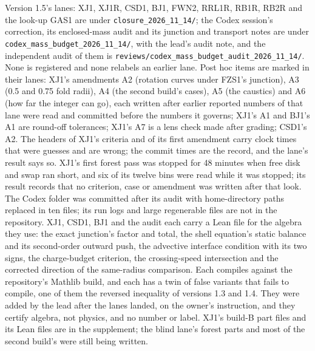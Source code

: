 \documentclass[10pt]{article}
\begin{document}
Version 1.5's lanes: XJ1, XJ1R, CSD1, BJ1, FWN2, RRL1R, RB1R, RB2R and the look-up GAS1 are under \texttt{closure\_2026\_11\_14/}; the Codex session's correction, its enclosed-mass audit and its junction and transport notes are under \texttt{codex\_mass\_budget\_2026\_11\_14/}, with the lead's audit note, and the independent audit of them is \texttt{reviews/codex\_mass\_budget\_audit\_2026\_11\_14/}. None is registered and none relabels an earlier lane. Post hoc items are marked in their lanes: XJ1's amendments A2 (rotation curves under FZS1's junction), A3 (0.5 and 0.75 fold radii), A4 (the second build's cases), A5 (the caustics) and A6 (how far the integer can go), each written after earlier reported numbers of that lane were read and committed before the numbers it governs; XJ1's A1 and BJ1's A1 are round-off tolerances; XJ1's A7 is a lens check made after grading; CSD1's A2. The headers of XJ1's criteria and of its first amendment carry clock times that were guesses and are wrong; the commit times are the record, and the lane's result says so. XJ1's first forest pass was stopped for 48 minutes when free disk and swap ran short, and six of its twelve bins were read while it was stopped; its result records that no criterion, case or amendment was written after that look. The Codex folder was committed after its audit with home-directory paths replaced in ten files; its run logs and large regenerable files are not in the repository. XJ1, CSD1, BJ1 and the audit each carry a Lean file for the algebra they use: the exact junction's factor and total, the shell equation's static balance and its second-order outward push, the advective interface condition with its two signs, the charge-budget criterion, the crossing-speed intersection and the corrected direction of the same-radius comparison. Each compiles against the repository's Mathlib build, and each has a twin of false variants that fails to compile, one of them the reversed inequality of versions 1.3 and 1.4. They were added by the lead after the lanes landed, on the owner's instruction, and they certify algebra, not physics, and no number or label. XJ1's build-B part files and its Lean files are in the supplement; the blind lane's forest parts and most of the second build's were still being written.
\end{document}
